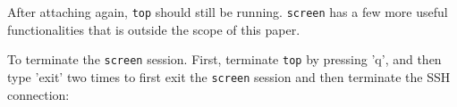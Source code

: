 After attaching again, \texttt{top} should still be running. \texttt{screen}
has a few more useful functionalities that is outside the scope of this
paper.

To terminate the \texttt{screen} session. First, terminate \texttt{top}
by pressing 'q', and then type 'exit' two times to first exit the
\texttt{screen} session and then terminate the \ac{SSH} connection:



